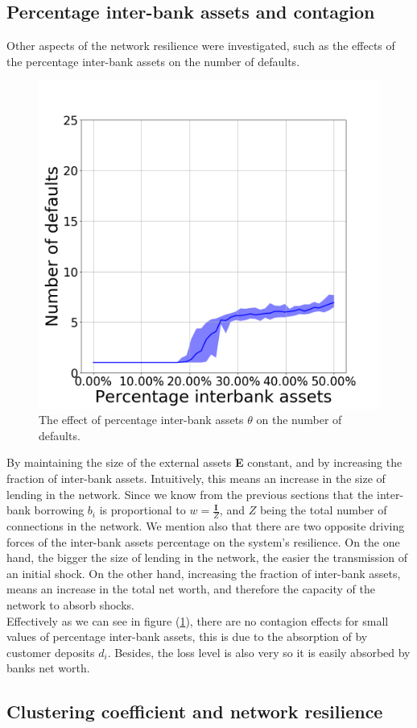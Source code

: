 \documentclass[14pt]{article}
\providecommand{\reff}[1]{(\ref{#1})}
\begin{document}
\subsection{Percentage inter-bank assets and contagion}
Other aspects of the network resilience were investigated, such as the effects of the percentage inter-bank assets on the number of defaults.
\begin{figure}[H]
    \centering
  \includegraphics[width=0.6\linewidth]{img/fig5.png}
  \caption{The effect of percentage inter-bank assets $\theta$ on the number of defaults.}
  \label{fig:5}
\end{figure}
By maintaining the size of the external assets \textbf{E} constant, and by increasing the fraction of inter-bank assets. Intuitively, this means an increase in the size of lending in the network. Since we know from the previous sections that the inter-bank borrowing $b_i$ is proportional to $w = \frac{\boldsymbol{I}}{Z}$, and $Z$ being the total number of connections in the network.  We mention also that there are two opposite driving forces of the inter-bank assets percentage on the system's resilience. On the one hand, the bigger the size of lending in the network, the easier the transmission of an initial shock. On the other hand, increasing the fraction of inter-bank assets, means an increase in the total net worth, and therefore the capacity of the network to absorb shocks.
\\Effectively as we can see in figure \reff{fig:5}, there are no contagion effects for small values of percentage inter-bank assets, this is due to the absorption of  by customer deposits $d_i$. Besides, the loss level is also very so it is easily absorbed by banks net worth.

\subsection{Clustering coefficient and network resilience}
\end{document}
